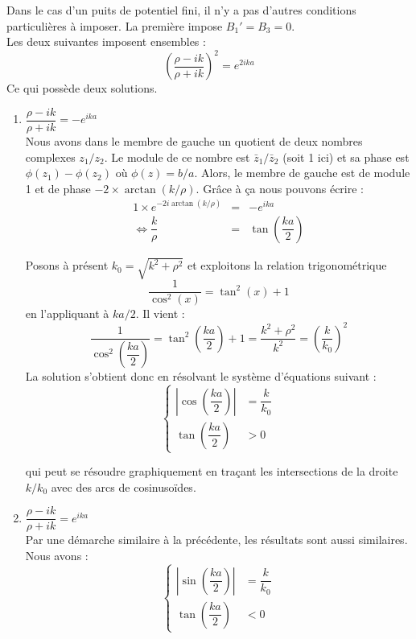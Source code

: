   Dans le cas d'un puits de potentiel fini, il n'y a pas d'autres conditions particulières à imposer. La première impose $B_1' = B_3 = 0$. \\
  
  Les deux suivantes imposent ensembles :
  \begin{equation}
    \left(\dfrac{\rho - ik}{\rho + ik} \right) ^2 = e ^{2ika}
  \end{equation}
  Ce qui possède deux solutions.
  \begin{enumerate}[label = (\roman*)]
    \item $\dfrac{\rho - ik}{\rho + ik} = -e^{ika}$ \\
    Nous avons dans le membre de gauche un quotient de deux nombres complexes $z_1/z_2$. Le module de ce nombre est $\bar z_1/\bar z_2$ (soit 1 ici) et sa phase est $\phi(z_1) - \phi(z_2)$ où $\phi(z) = b/a$. Alors, le membre de gauche est de module 1 et de phase $-2\times \arctan(k/\rho)$. Grâce à ça nous pouvons écrire :
    \begin{eqnarray*}
      1\times e^{-2i\arctan(k/\rho)} &=& - e^{ika} \\
      \iff \dfrac{k}{\rho} &=& \tan\left(\dfrac{ka}{2}\right)
    \end{eqnarray*}
    
    Posons à présent $k_0 = \sqrt{k^2 + \rho ^2}$ et exploitons la relation trigonométrique $$\dfrac{1}{\cos ^2(x)} = \tan^2(x) +1$$ en l'appliquant à $ka/2$. Il vient :
    $$\dfrac{1}{\cos ^2\left(\dfrac{ka}{2}\right)} = \tan^2\left(\dfrac{ka}{2}\right) +1  = \dfrac{k^2 + \rho^2}{k^2} = \left(\dfrac{k}{k_0}\right)^2$$
    La solution s'obtient donc en résolvant le système d'équations suivant :
    \begin{equation}
      \left\{ \begin{array}{ll}
        \left| \cos \left(\dfrac{ka}{2}\right)\right| &= \dfrac{k}{k_0} \\
        \tan \left(\dfrac{ka}{2}\right) &>0
      \end{array}\right.
    \end{equation}
    
    qui peut se résoudre graphiquement en traçant les intersections de la droite $k/k_0$ avec des arcs de cosinusoïdes. \\
    \item $\dfrac{\rho - ik}{\rho + ik} = e^{ika}$ \\
    
    Par une démarche similaire à la précédente, les résultats sont aussi similaires. Nous avons :
    \begin{equation}
      \left\{ \begin{array}{ll}
        \left| \sin \left(\dfrac{ka}{2}\right)\right| &= \dfrac{k}{k_0} \\
      \tan \left(\dfrac{ka}{2}\right) &<0
    \end{array}\right.
  \end{equation}
\end{enumerate}
